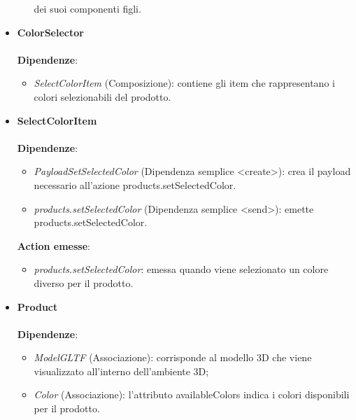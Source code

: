 \begin{itemize}
\begin{itemize}
			dei suoi componenti figli.
		\end{itemize}
		\item \textbf{ColorSelector}
		\\\\
		\textbf{Dipendenze}:
		\begin{itemize}
			\item \textit{SelectColorItem} (Composizione): contiene gli item che rappresentano i colori selezionabili del prodotto.
		\end{itemize}
		\item \textbf{SelectColorItem}
		\\\\
		\textbf{Dipendenze}:
		\begin{itemize}
			\item \textit{PayloadSetSelectedColor} (Dipendenza semplice \textless create\textgreater): crea il payload necessario all'azione products.setSelectedColor.
			\item \textit{products.setSelectedColor} (Dipendenza semplice \textless send\textgreater): emette products.setSelectedColor.
		\end{itemize}
		\textbf{Action emesse}:
		\begin{itemize}
			\item \textit{products.setSelectedColor}: emessa quando viene selezionato un colore diverso per il prodotto.
		\end{itemize}
		\item \textbf{Product}
		\\\\
		\textbf{Dipendenze}:
		\begin{itemize}
			\item \textit{ModelGLTF} (Associazione): corrisponde al modello 3D che viene visualizzato all'interno dell'ambiente 3D;
			\item \textit{Color} (Associazione): l'attributo availableColors indica i colori disponibili per il prodotto.
		\end{itemize}
\end{itemize}

